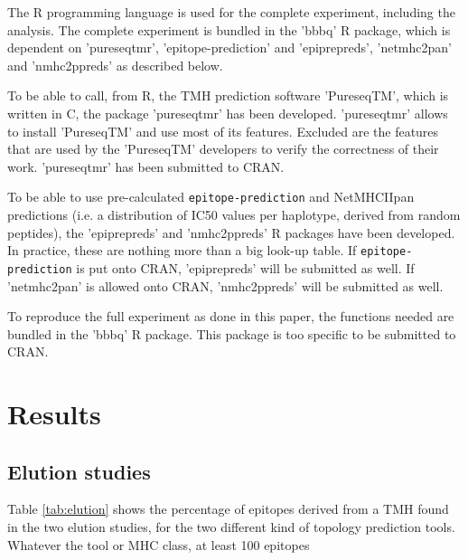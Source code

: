 The R programming language is used for the complete 
experiment, including the analysis.
The complete experiment is bundled in the 'bbbq' R package,
which is dependent on 'pureseqtmr', 
'epitope-prediction' and 'epiprepreds',
'netmhc2pan' and 'nmhc2ppreds'
as described below.

To be able to call, from R, the TMH prediction software 'PureseqTM',
which is written in C, the package 'pureseqtmr' has been developed. 
'pureseqtmr' allows to install 'PureseqTM' and use most of its features.
Excluded are the features that are used by the 'PureseqTM' 
developers to verify the correctness of their work.
'pureseqtmr' has been submitted to CRAN.

To be able to use pre-calculated 
\verb;epitope-prediction; and NetMHCIIpan
predictions (i.e. a distribution of IC50 values per haplotype, 
derived from random peptides), the 'epiprepreds' and 'nmhc2ppreds' 
R packages have been 
developed. In practice, these are nothing more than a big look-up table.
If \verb;epitope-prediction; is put onto CRAN, 'epiprepreds'
will be submitted as well.
If 'netmhc2pan' is allowed onto CRAN, 'nmhc2ppreds'
will be submitted as well.

To reproduce the full experiment as done in this paper,
the functions needed are bundled in the 'bbbq' R package.
This package is too specific to be submitted to CRAN.

\section{Results}

\subsection{Elution studies}



Table \ref{tab:elution} shows the percentage of epitopes derived from a TMH
found in the two elution studies, for the two different kind of topology
prediction tools. Whatever the tool or MHC class, at least 100 epitopes

